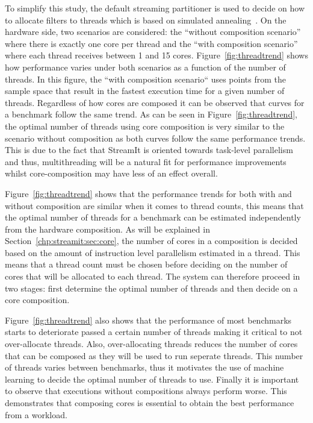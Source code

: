 To simplify this study, the default streaming partitioner is used to decide on how to allocate filters to threads which is based on simulated annealing~\cite{simulatedAnnealing1983}.
On the hardware side, two scenarios are considered: the ``without composition scenario'' where there is exactly one core per thread and the ``with composition scenario'' where each thread receives between 1 and 15 cores.
Figure~\ref{fig:threadtrend} shows how performance varies under both scenarios as a function of the number of threads.
In this figure, the ``with composition scenario`` uses points from the sample space that result in the fastest execution time for a given number of threads.
Regardless of how cores are composed it can be observed that curves for a benchmark follow the same trend.
As can be seen in Figure~\ref{fig:threadtrend}, the optimal number of threads using core composition is very similar to the scenario without composition as both curves follow the same performance trends.
This is due to the fact that StreamIt is oriented towards task-level parallelism and thus, multithreading will be a natural fit for performance improvements whilst core-composition may have less of an effect overall.

Figure~\ref{fig:threadtrend} shows that the performance trends for both with and without composition are similar when it comes to thread counts, this  means that the optimal number of threads for a benchmark can be estimated independently from the hardware composition.
As will be explained in Section~\ref{chp:streamit:sec:core}, the number of cores in a composition is decided based on the amount of instruction level parallelism estimated in a thread.
This means that a thread count must be chosen before deciding on the number of cores that will be allocated to each thread.
The system can therefore proceed in two stages: first determine the optimal number of threads and then decide on a core composition.

Figure~\ref{fig:threadtrend} also shows that the performance of most benchmarks starts to deteriorate passed a certain number of threads making it critical to not over-allocate threads.
Also, over-allocating threads reduces the number of cores that can be composed as they will be used to run seperate threads.
This number of threads varies between benchmarks, thus it motivates the use of machine learning to decide the optimal number of threads to use.
Finally it is important to observe that executions without compositions always perform worse.
This demonstrates that composing cores is essential to obtain the best performance from a workload.


